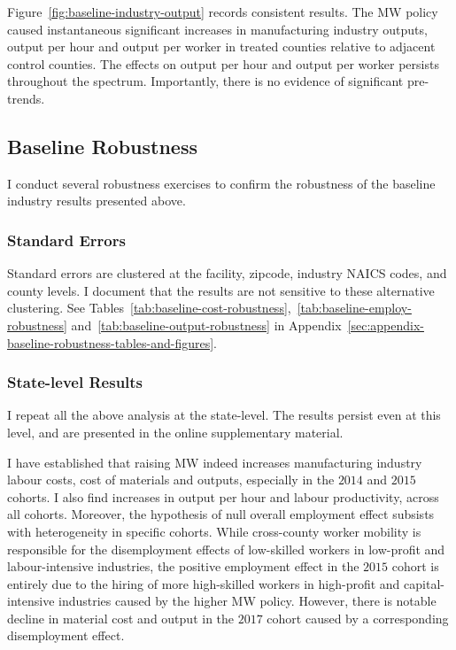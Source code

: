 \documentclass[12pt, english]{article}
\begin{document}
    Figure~\ref{fig:baseline-industry-output} records consistent results. The MW policy caused instantaneous significant increases in manufacturing industry outputs, output per hour and output per worker in treated counties relative to adjacent control counties. The effects on output per hour and output per worker persists throughout the spectrum. Importantly, there is no evidence of significant pre-trends.
    

    \subsection{Baseline Robustness}\label{subsec:baseline-robustness}
    I conduct several robustness exercises to confirm the robustness of the baseline industry results presented above.

    \subsubsection{Standard Errors} Standard errors are clustered at the facility, zipcode, industry NAICS codes, and county levels. I document that the results are not sensitive to these alternative clustering. See Tables~\ref{tab:baseline-cost-robustness},~\ref{tab:baseline-employ-robustness} and~\ref{tab:baseline-output-robustness} in Appendix~\ref{sec:appendix-baseline-robustness-tables-and-figures}.

    \subsubsection{State-level Results} I repeat all the above analysis at the state-level. The results persist even at this level, and are presented in the online supplementary material.

    I have established that raising MW indeed increases manufacturing industry labour costs, cost of materials and outputs, especially in the $2014$ and $2015$ cohorts. I also find increases in output per hour and labour productivity, across all cohorts. Moreover, the hypothesis of null overall employment effect subsists with heterogeneity in specific cohorts. While cross-county worker mobility is responsible for the disemployment effects of low-skilled workers in low-profit and labour-intensive industries, the positive employment effect in the $2015$ cohort is entirely due to the hiring of more high-skilled workers in high-profit and capital-intensive industries caused by the higher MW policy. However, there is notable decline in material cost and output in the $2017$ cohort caused by a corresponding disemployment effect.
\end{document}
